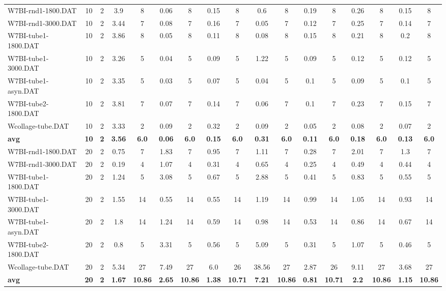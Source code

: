 \begin{table}[!ht]
{\begin{tabular}{lcccccccccccccccc}
W7BI-rnd1-1800.DAT & 10 & 2 & 3.9 & 8 & 0.06 & 8 & 0.15 & 8 & 0.6 & 8 & 0.19 & 8 & 0.26 & 8 & 0.15 & 8 \\
W7BI-rnd1-3000.DAT & 10 & 2 & 3.44 & 7 & 0.08 & 7 & 0.16 & 7 & 0.05 & 7 & 0.12 & 7 & 0.25 & 7 & 0.14 & 7 \\
W7BI-tube1-1800.DAT & 10 & 2 & 3.86 & 8 & 0.05 & 8 & 0.11 & 8 & 0.08 & 8 & 0.15 & 8 & 0.21 & 8 & 0.2 & 8 \\
W7BI-tube1-3000.DAT & 10 & 2 & 3.26 & 5 & 0.04 & 5 & 0.09 & 5 & 1.22 & 5 & 0.09 & 5 & 0.12 & 5 & 0.12 & 5 \\
W7BI-tube1-asyn.DAT & 10 & 2 & 3.35 & 5 & 0.03 & 5 & 0.07 & 5 & 0.04 & 5 & 0.1 & 5 & 0.09 & 5 & 0.1 & 5 \\
W7BI-tube2-1800.DAT & 10 & 2 & 3.81 & 7 & 0.07 & 7 & 0.14 & 7 & 0.06 & 7 & 0.1 & 7 & 0.23 & 7 & 0.15 & 7 \\
Wcollage-tube.DAT & 10 & 2 & 3.33 & 2 & 0.09 & 2 & 0.32 & 2 & 0.09 & 2 & 0.05 & 2 & 0.08 & 2 & 0.07 & 2 \\
\cline{1-17} \textbf{avg} & \textbf{10} & \textbf{2} & \textbf{3.56} & \textbf{6.0} & \textbf{0.06} & \textbf{6.0} & \textbf{0.15} & \textbf{6.0} & \textbf{0.31} & \textbf{6.0} & \textbf{0.11} & \textbf{6.0} & \textbf{0.18} & \textbf{6.0} & \textbf{0.13} & \textbf{6.0} \\ \cline{1-17}
W7BI-rnd1-1800.DAT & 20 & 2 & 0.75 & 7 & 1.83 & 7 & 0.95 & 7 & 1.11 & 7 & 0.28 & 7 & 2.01 & 7 & 1.3 & 7 \\
W7BI-rnd1-3000.DAT & 20 & 2 & 0.19 & 4 & 1.07 & 4 & 0.31 & 4 & 0.65 & 4 & 0.25 & 4 & 0.49 & 4 & 0.44 & 4 \\
W7BI-tube1-1800.DAT & 20 & 2 & 1.24 & 5 & 3.08 & 5 & 0.67 & 5 & 2.88 & 5 & 0.41 & 5 & 0.83 & 5 & 0.55 & 5 \\
W7BI-tube1-3000.DAT & 20 & 2 & 1.55 & 14 & 0.55 & 14 & 0.55 & 14 & 1.19 & 14 & 0.99 & 14 & 1.05 & 14 & 0.93 & 14 \\
W7BI-tube1-asyn.DAT & 20 & 2 & 1.8 & 14 & 1.24 & 14 & 0.59 & 14 & 0.98 & 14 & 0.53 & 14 & 0.86 & 14 & 0.67 & 14 \\
W7BI-tube2-1800.DAT & 20 & 2 & 0.8 & 5 & 3.31 & 5 & 0.56 & 5 & 5.09 & 5 & 0.31 & 5 & 1.07 & 5 & 0.46 & 5 \\
Wcollage-tube.DAT & 20 & 2 & 5.34 & 27 & 7.49 & 27 & 6.0 & 26 & 38.56 & 27 & 2.87 & 26 & 9.11 & 27 & 3.68 & 27 \\
\cline{1-17} \textbf{avg} & \textbf{20} & \textbf{2} & \textbf{1.67} & \textbf{10.86} & \textbf{2.65} & \textbf{10.86} & \textbf{1.38} & \textbf{10.71} & \textbf{7.21} & \textbf{10.86} & \textbf{0.81} & \textbf{10.71} & \textbf{2.2} & \textbf{10.86} & \textbf{1.15} & \textbf{10.86} \\ \cline{1-17}

\end{tabular}}
\end{table}
